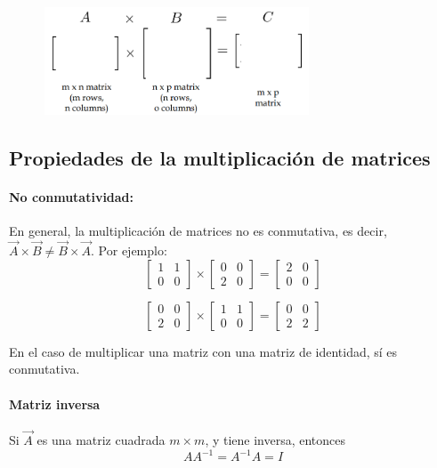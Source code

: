 \begin{figure}[h]
\centering
\includegraphics[width = 0.7\textwidth]{figs/matrix-matrix-mult.png}
\end{figure}

\subsection{Propiedades de la multiplicación de matrices}
\paragraph{No conmutatividad:} En general, la multiplicación de matrices no es conmutativa, es decir, $\vec{A} \times \vec{B} \neq \vec{B} \times \vec{A}$. Por ejemplo:
$$\begin{bmatrix}
1 & 1 \\ 0 & 0
\end{bmatrix} \times \begin{bmatrix}
0 & 0 \\ 2 & 0
\end{bmatrix} = \begin{bmatrix}
2 & 0 \\ 0 & 0
\end{bmatrix} $$

$$\begin{bmatrix}
0 & 0 \\ 2 & 0
\end{bmatrix} \times \begin{bmatrix}
1 & 1 \\ 0 & 0
\end{bmatrix} = \begin{bmatrix}
0 & 0 \\ 2 & 2
\end{bmatrix} $$

En el caso de multiplicar una matriz con una matriz de identidad, sí es conmutativa.

\paragraph{Matriz inversa} Si $\vec{A}$ es una matriz cuadrada $m \times m$, y tiene inversa, entonces
$$AA^{-1} = A^{-1}A = I$$


